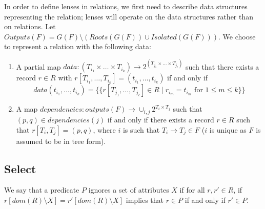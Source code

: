 \documentclass[acmsmall,review,anonymous]{acmart}\settopmatter{printfolios=true,printccs=false,printacmref=false}
\theoremstyle{definition}
\begin{document}
In order to define lenses in relations, we first need to describe data
structures representing the relation; lenses will operate on the data
structures rather than on relations. Let $Outputs(F) = G(F) \setminus
(Roots(G(F)) \cup Isolated(G(F)))$. We choose to represent a relation with the
following data:
\begin{enumerate}
  \item
  A partial map $data : (T_{i_1} \times \ldots \times T_{i_k})
  \longrightarrow 2^{(T_{j_1} \times \ldots \times T_{j_{\ell}})}$ such that
  there exists a record $r \in R$ with $r[T_{i_1}, \ldots, T_{i_k}] =
  (t_{i_1}, \ldots, t_{i_k})$ if and only if
  $$data(t_{i_1}, \ldots, t_{i_k}) =  \{\{r[T_{j_1}, \ldots, T_{j_{\ell}}] \in
  R \; | \; r_{i_m} = t_{i_m} \text{ for }1 \leq m \leq k\}\}$$
  \item
  A map $dependencies : outputs(F) \longrightarrow \cup_{i,j} 2^{T_i \times
  T_j}$ such that $(p, q) \in dependencies(j)$ if and only if there exists a
  record $r \in R$ such that $r[T_i, T_j] = (p, q)$, where $i$ is such that
  $T_i \longrightarrow T_j \in F$ ($i$ is unique as $F$ is assumed to be in tree
  form).
\end{enumerate}
\subsection{Select}
We say that a predicate $P$ ignores a set of attributes $X$ if for all $r, r'
\in R$, if $r[dom(R) \setminus X] = r'[dom(R) \setminus X]$ implies that $r
\in P$ if and only if $r' \in P$.
\end{document}
